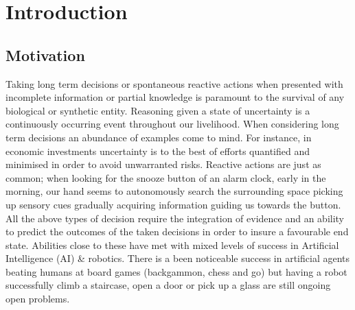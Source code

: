\chapter{Introduction}

\section{Motivation}
% 
%
%
%
%

%
%
%
%


%
%
%
%
%
%

Taking long term decisions or spontaneous reactive actions when presented with incomplete information or partial knowledge is 
paramount to the survival of any biological or synthetic entity. Reasoning given a state of uncertainty is a continuously occurring event throughout our 
livelihood. When considering long term decisions an abundance of examples come to mind. For instance, in economic investments 
uncertainty is to the best of efforts quantified and minimised in order to avoid unwarranted risks. Reactive actions are just as common; 
when looking for the snooze button of an alarm clock, early in the morning, our hand seems to autonomously search the surrounding space picking up
sensory cues gradually acquiring information guiding us towards the button. All the above types of decision require the integration of 
evidence and an ability to predict the outcomes of the taken decisions in order to insure a favourable end state. 
Abilities close to these have met with mixed levels of success in Artificial Intelligence (AI) \& robotics. There is a been 
noticeable success in artificial agents beating humans at board games (backgammon, chess and go) but having a robot successfully 
climb a staircase, open a door or pick up a glass are still ongoing open problems. 


